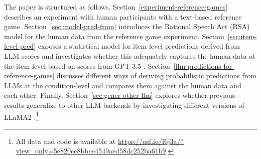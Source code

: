 \documentclass[fleqn]{article}
\begin{document}

The paper is structured as follows.
Section~\ref{experiment-reference-games} describes an experiment with human participants with a text-based reference game.
Section~\ref{sec:model-pred-from} introduces the Rational Speech Act (RSA) model for the human data from the reference game experiment.
Section~\ref{sec:item-level-pred} exposes a statistical model for item-level predictions derived from LLM scores and investigates whether this adequately captures the human data at the item-level based on scores from GPT-3.5 \citep{BrownMann2020:Language-Models}.
Section~\ref{llm-predictions-for-reference-games} discusses different ways of deriving probabilistic predictions from LLMs at the condition-level and compares them against the human data and each other.
Finally, Section~\ref{sec:gener-other-llm} explores whether previous results generalize to other LLM backends by investigating different versions of LLaMA2 \citep{TouvronLavril2023:LLaMA:-Open-and}.\footnote{
  All data and code is available at \url{https://osf.io/f6j3a/?view_only=5e820cc8bbee4549aed58dc252ba61b9}.
}
\end{document}
